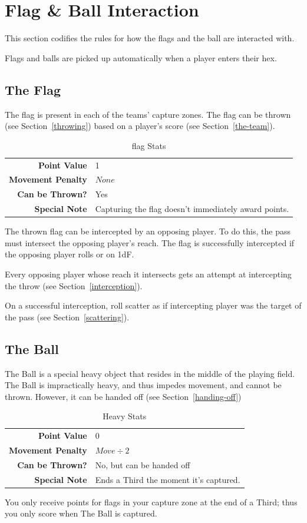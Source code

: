 \section{Flag \& Ball Interaction} \label{flag-interaction}
This section codifies the rules for how the flags and the ball are interacted with.

Flags and balls are picked up automatically when a player enters their hex.

\subsection{The Flag}
The flag is present in each of the teams' capture zones.
The flag can be thrown (see Section~\ref{throwing}) based on a player's \throw{} score (see Section~\ref{the-team}).

\begin{table}[!ht]
    \centering
\begin{tabular}{r|l}
    \textbf{Point Value} & 1 \\
    \textbf{Movement Penalty} & $None$ \\
    \textbf{Can be Thrown?} & Yes \\
    \textbf{Special Note} & Capturing the flag doesn't immediately award points. \\
\end{tabular} 
    \caption{flag Stats}
    \label{tab:flag}
\end{table}
The thrown flag can be intercepted by an opposing player.
To do this, the pass must intersect the opposing player's reach.
The flag is successfully intercepted if the opposing player rolls \blank{} or \plus{} on 1dF.

Every opposing player whose reach it intersects gets an attempt at intercepting the throw (see Section~\ref{interception}).

On a successful interception, roll scatter as if intercepting player was the target of the pass (see Section~\ref{scattering}).

\subsection{The Ball}
The Ball is a special heavy object that resides in the middle of the playing field.
The Ball is impractically heavy, and thus impedes movement, and cannot be thrown.
However, it can be handed off (see Section~\ref{handing-off})

\begin{table}[!ht]
    \centering
\begin{tabular}{r|l}
    \textbf{Point Value} & $0$ \\
    \textbf{Movement Penalty} & $Move\div 2$ \\
    \textbf{Can be Thrown?} & No, but can be handed off \\
    \textbf{Special Note} & Ends a Third the moment it’s captured.\\
\end{tabular}
    \caption{Heavy Stats}
    \label{tab:heavy}
\end{table}
You only receive points for flags in your capture zone at the end of a Third; thus you only score when The Ball is captured.

